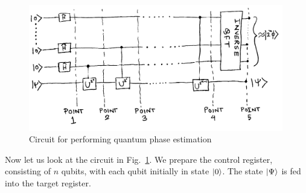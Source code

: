 \documentclass[12pt,oneside]{book}
\begin{document}
\begin{figure}
    \centering
\includegraphics[width=0.99\textwidth]{QPE.png}
    \caption{Circuit for performing quantum phase estimation}
    \label{QPE_circuit}
\end{figure}

Now let us look at the circuit in Fig.~\ref{QPE_circuit}. We prepare the control register, consisting of $n$ qubits, with each qubit initially in state $\ket{0}$. The state $\ket{\Psi}$ is fed into the target register. 
\end{document}
